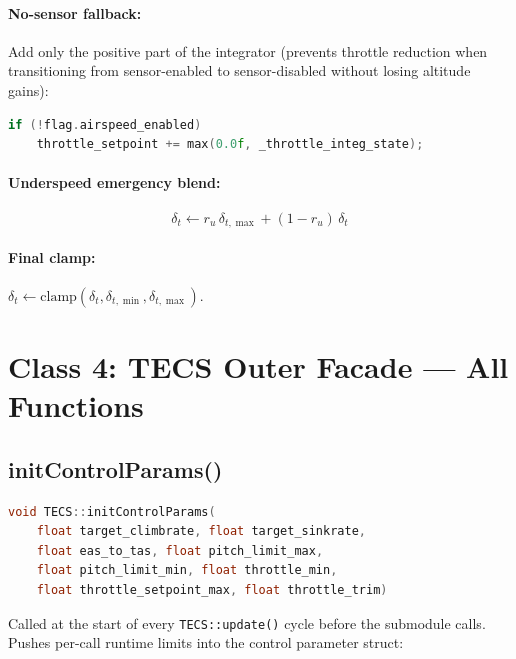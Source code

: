 \documentclass[12pt,a4paper]{article}
\begin{document}
\paragraph{No-sensor fallback:} Add only the positive part of the integrator
(prevents throttle reduction when transitioning from sensor-enabled to
sensor-disabled without losing altitude gains):
\begin{lstlisting}[language=C++]
if (!flag.airspeed_enabled)
    throttle_setpoint += max(0.0f, _throttle_integ_state);
\end{lstlisting}

\paragraph{Underspeed emergency blend:}
\begin{equation}
  \delta_t \leftarrow r_u\,\delta_{t,\max} + (1 - r_u)\,\delta_t
\end{equation}

\paragraph{Final clamp:}
$\delta_t \leftarrow \text{clamp}(\delta_t, \delta_{t,\min}, \delta_{t,\max})$.

\section{Class 4: TECS Outer Facade --- All Functions}

\subsection{initControlParams()}

\begin{lstlisting}[language=C++]
void TECS::initControlParams(
    float target_climbrate, float target_sinkrate,
    float eas_to_tas, float pitch_limit_max,
    float pitch_limit_min, float throttle_min,
    float throttle_setpoint_max, float throttle_trim)
\end{lstlisting}

Called at the start of every \texttt{TECS::update()} cycle before the
submodule calls. Pushes per-call runtime limits into the control
parameter struct:
\end{document}
